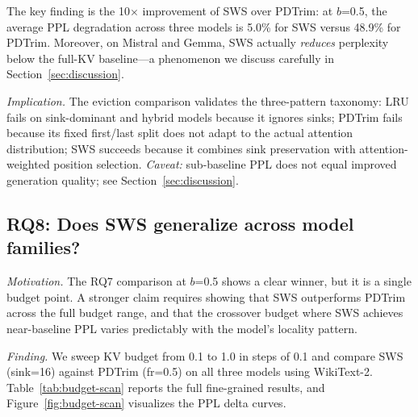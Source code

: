 \documentclass[11pt]{article}
\newcommand{\method}{SWS}
\newcommand{\sws}{SWS}
\newcommand{\pct}{\%}
\theoremstyle{definition}
\theoremstyle{plain}
\begin{document}
The key finding is the 10$\times$ improvement of \sws{} over PDTrim: at $b$=0.5, the average PPL degradation across three models is 5.0\pct{} for \sws{} versus 48.9\pct{} for PDTrim.  Moreover, on Mistral and Gemma, \sws{} actually \emph{reduces} perplexity below the full-KV baseline---a phenomenon we discuss carefully in Section~\ref{sec:discussion}.

\emph{Implication.}  The eviction comparison validates the three-pattern taxonomy: LRU fails on sink-dominant and hybrid models because it ignores sinks; PDTrim fails because its fixed first/last split does not adapt to the actual attention distribution; \sws{} succeeds because it combines sink preservation with attention-weighted position selection.  \emph{Caveat:} sub-baseline PPL does not equal improved generation quality; see Section~\ref{sec:discussion}.

\subsection{RQ8: Does SWS generalize across model families?}
\label{sec:rq8}

\emph{Motivation.}  The RQ7 comparison at $b$=0.5 shows a clear winner, but it is a single budget point.  A stronger claim requires showing that \method{} outperforms PDTrim across the full budget range, and that the crossover budget where \method{} achieves near-baseline PPL varies predictably with the model's locality pattern.

\emph{Finding.}  We sweep KV budget from 0.1 to 1.0 in steps of 0.1 and compare \sws{} (sink=16) against PDTrim (fr=0.5) on all three models using WikiText-2.  Table~\ref{tab:budget-scan} reports the full fine-grained results, and Figure~\ref{fig:budget-scan} visualizes the PPL delta curves.
\end{document}
